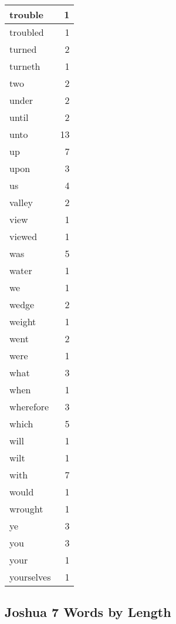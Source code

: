\begin{center}
\begin{longtable}{l|r}
trouble & 1\\ \hline 
troubled & 1\\ \hline 
turned & 2\\ \hline 
turneth & 1\\ \hline 
two & 2\\ \hline 
under & 2\\ \hline 
until & 2\\ \hline 
unto & 13\\ \hline 
up & 7\\ \hline 
upon & 3\\ \hline 
us & 4\\ \hline 
valley & 2\\ \hline 
view & 1\\ \hline 
viewed & 1\\ \hline 
was & 5\\ \hline 
water & 1\\ \hline 
we & 1\\ \hline 
wedge & 2\\ \hline 
weight & 1\\ \hline 
went & 2\\ \hline 
were & 1\\ \hline 
what & 3\\ \hline 
when & 1\\ \hline 
wherefore & 3\\ \hline 
which & 5\\ \hline 
will & 1\\ \hline 
wilt & 1\\ \hline 
with & 7\\ \hline 
would & 1\\ \hline 
wrought & 1\\ \hline 
ye & 3\\ \hline 
you & 3\\ \hline 
your & 1\\ \hline 
yourselves & 1\\ \hline 
\end{longtable}
\end{center}





\subsection{Joshua 7 Words by Length}


\normalsize
 
